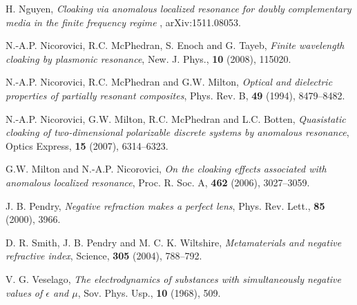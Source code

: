 \documentclass[11pt,reqno,twoside]{amsart}
\theoremstyle{definition}
\theoremstyle{remark}
\numberwithin{equation}{section}
\begin{document}
\begin{thebibliography}{99}
 H. Nguyen, \emph{ Cloaking via anomalous localized resonance for doubly complementary media in the finite frequency regime }, arXiv:1511.08053. 

 {N.-A.P. Nicorovici, R.C. McPhedran, S. Enoch and G. Tayeb}, \emph{Finite wavelength cloaking
by plasmonic resonance}, New. J. Phys., {\bf 10} (2008), 115020.

 {N.-A.P. Nicorovici, R.C. McPhedran and G.W. Milton}, \emph{Optical and dielectric properties
of partially resonant composites}, Phys. Rev. B, {\bf 49} (1994), 8479--8482.

 {N.-A.P. Nicorovici, G.W. Milton, R.C. McPhedran and L.C. Botten}, \emph{Quasistatic cloaking
of two-dimensional polarizable discrete systems by anomalous resonance}, Optics
Express, {\bf 15} (2007), 6314--6323.

 G.W. Milton and N.-A.P. Nicorovici, \emph{On the cloaking effects associated
 with anomalous localized resonance}, Proc. R. Soc. A, \textbf{462} (2006),
  3027--3059.

 J. B. Pendry, {\it Negative refraction makes a perfect lens}, Phys. Rev. Lett., {\bf 85} (2000), 3966.

 D. R. Smith, J. B. Pendry and M. C. K. Wiltshire, {\it Metamaterials and negative refractive index}, Science, {\bf 305} (2004), 788--792.

  V. G. Veselago, {\it The electrodynamics of substances with simultaneously negative values of $\epsilon$ and $\mu$}, Sov. Phys. Usp., {\bf 10} (1968), 509.



\end{thebibliography}
\end{document}
